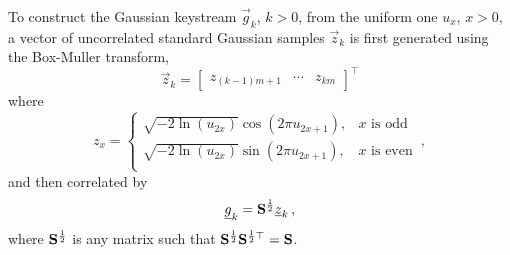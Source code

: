 \documentclass[letterpaper, 10 pt, conference]{ieeeconf}
\begin{document}
To construct the Gaussian keystream $\vec{g}_k$, $k>0$, from the uniform one $u_x$, $x>0$, a vector of uncorrelated standard Gaussian samples $\vec{z}_k$ is first generated using the Box-Muller transform,
\begin{equation}\label{eqn:standard_gaussian_generation}
    \vec{z}_k = 
  \begin{bmatrix}
    z_{(k-1)m+1} & \cdots & z_{km}
  \end{bmatrix}^\top
\end{equation}
where 
\begin{equation*}
  z_x =
  \begin{cases}
    \sqrt{-2\ln(u_{2x})}\cos(2\pi u_{2x+1}), & x \text{ is odd}\\
    \sqrt{-2\ln(u_{2x})}\sin(2\pi u_{2x+1}), & x \text{ is even}\\
  \end{cases}\,,
\end{equation*}
and then correlated by
\begin{equation}\label{eqn:gaussian_keystream_generation}
    {\underline{g}}_k = {{\mathbf{S}}}^\frac{1}{2}{\underline{z}}_k\,,
\end{equation}
where ${{\mathbf{S}}}^\frac{1}{2}$ is any matrix such that ${{\mathbf{S}}}^\frac{1}{2}{{\mathbf{S}}}^{\frac{1}{2}\top} = {{\mathbf{S}}}$.

% 
% 
\end{document}
